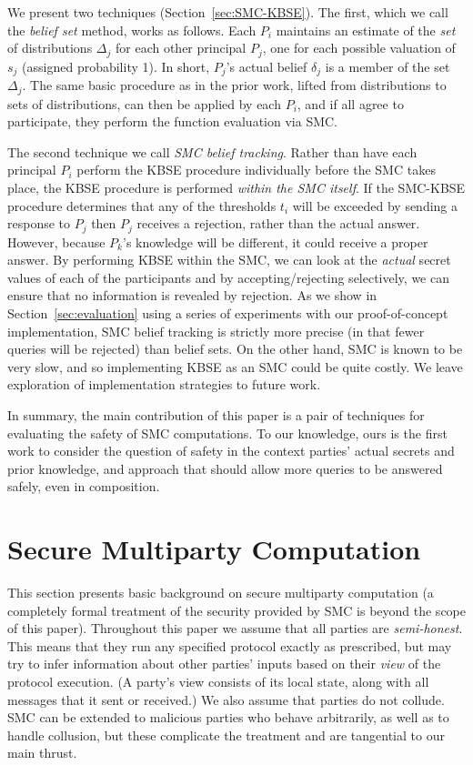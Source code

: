 \documentclass[10pt]{sigplanconf}
\begin{document}
We present two techniques (Section~\ref{sec:SMC-KBSE}).  The first,
which we call the \emph{belief set} method, works as follows.  Each
$P_i$ maintains an estimate of the \emph{set} of distributions
$\Delta_j$ for each other principal $P_j$, one for each possible
valuation of $s_j$ (assigned probability 1).  In short, $P_j$'s actual
belief $\delta_j$ is a member of the set $\Delta_j$.  The same basic
procedure as in the prior work, lifted from distributions to sets of
distributions, can then be applied by each $P_i$, and if all agree to
participate, they perform the function evaluation via SMC.

The second technique we call \emph{SMC belief tracking}.  
Rather than have each
principal $P_i$ perform the KBSE procedure individually before the SMC
takes place, the KBSE procedure is performed \emph{within the SMC
  itself}.  If the SMC-KBSE procedure determines that any of the
thresholds $t_i$ will be exceeded by sending a response to $P_j$ then
$P_j$ receives a rejection, rather than the actual answer.  However,
because $P_k$'s knowledge will be different, it could receive a proper
answer.  By performing KBSE within the SMC, we can look at the
\emph{actual} secret values of each of the participants and by
accepting/rejecting selectively, we can ensure that no information is
revealed by rejection.  As we show in Section~\ref{sec:evaluation}
using a series of experiments with our proof-of-concept
implementation, SMC belief tracking is strictly more precise (in that
fewer queries will be rejected) than belief sets.  On the other hand,
SMC is known to be very slow, and so implementing KBSE as an SMC could
be quite costly.  We leave exploration of implementation strategies to
future work.

In summary, the main contribution of this paper is a pair of
techniques for evaluating the safety of SMC computations.  To our
knowledge, ours is the first work to consider the question of safety
in the context parties' actual secrets and prior knowledge, and
approach that should allow more queries to be answered safely, even in
composition.

\section{Secure Multiparty Computation}
\label{sec:MPC-overview}

This section presents basic background on secure multiparty
computation (a completely formal treatment of the security provided by
SMC is beyond the scope of this paper).  Throughout this paper we
assume that all parties are \emph{semi-honest}. This means that they
run any specified protocol exactly as prescribed, but may try to
infer information about other parties' inputs based on their
\emph{view} of the protocol execution.
(A party's view consists of its
local state, along with all messages that it sent or received.) We also assume that parties do not collude.
SMC can be extended to malicious parties who behave arbitrarily, as well as to handle
collusion, but these
complicate the treatment and are tangential to our main thrust.
\end{document}
